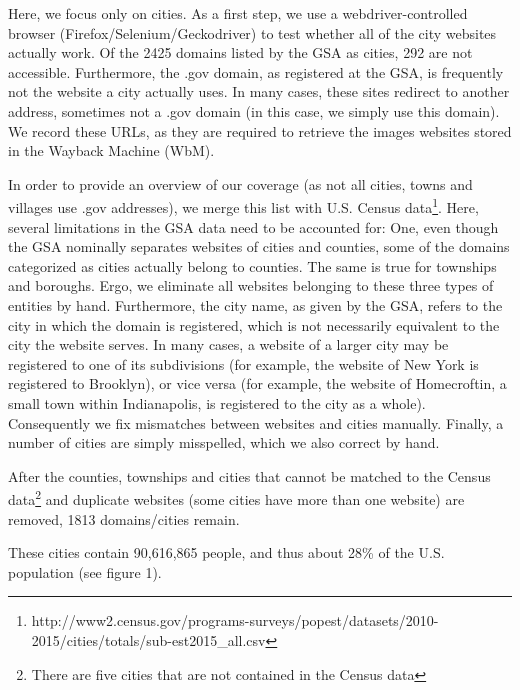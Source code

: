 \documentclass[11pt]{article}
\begin{document}
Here, we focus only on cities. As a first step, we use a webdriver-controlled browser (Firefox/Selenium/Geckodriver) to test whether all of the city websites actually work. Of the 2425 domains listed by the GSA as cities, 292 are not accessible. Furthermore, the .gov domain, as registered at the GSA, is frequently not the website a city actually uses. In many cases, these sites redirect to another address, sometimes not a .gov domain (in this case, we simply use this domain). We record these URLs, as they are required to retrieve the images websites stored in the Wayback Machine (WbM).

In order to provide an overview of our coverage (as not all cities, towns and villages use .gov addresses), we merge this list with U.S. Census data\footnote{http://www2.census.gov/programs-surveys/popest/datasets/2010-2015/cities/totals/sub-est2015\_all.csv}. Here, several limitations in the GSA data need to be accounted for: One, even though the GSA nominally separates websites of cities and counties, some of the domains categorized as cities actually belong to counties. The same is true for townships and boroughs. Ergo, we eliminate all websites belonging to these three types of entities by hand. Furthermore, the city name, as given by the GSA, refers to the city in which the domain is registered, which is not necessarily equivalent to the city the website serves. In many cases, a website of a larger city may be registered to one of its subdivisions (for example, the website of New York is registered to Brooklyn), or vice versa (for example, the website of Homecroftin, a small town within Indianapolis, is registered to the city as a whole). Consequently we fix mismatches between websites and cities manually. Finally, a number of cities are simply misspelled, which we also correct by hand.

After the counties, townships and cities that cannot be matched to the Census data\footnote{There are five cities that are not contained in the Census data} and duplicate websites (some cities have more than one website) are removed, 1813 domains/cities remain.

These cities contain 90,616,865 people, and thus about 28\% of the U.S. population (see figure 1).
\end{document}
